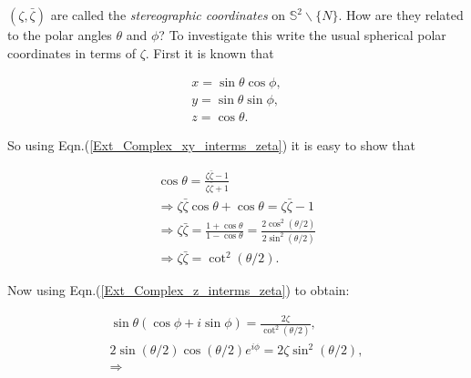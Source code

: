 $(\zeta, \bar{\zeta})$ are called the \textit{stereographic coordinates} on $\mathbb{S}^2 \backslash \{N\}$. How are they related to the polar angles $\theta$ and $\phi$? To investigate this write the usual spherical polar coordinates in terms of $\zeta$. First it is known that

\begin{eqnarray*}
x = \sin{\theta}\cos{\phi}, \\
y = \sin{\theta}\sin{\phi}, \\
z = \cos{\theta}.
\end{eqnarray*}

\noindent So using Eqn.(\ref{Ext_Complex_xy_interms_zeta}) it is easy to show that

\begin{eqnarray*}
\cos{\theta} = \frac{\zeta\bar{\zeta} - 1}{\zeta\bar{\zeta} + 1} \\
\Rightarrow \zeta\bar{\zeta}\cos{\theta} + \cos{\theta} = \zeta\bar{\zeta} - 1\\
\Rightarrow \zeta\bar{\zeta} = \frac{1 + \cos{\theta}}{1 - \cos{\theta}} = \frac{2\cos^2{\left(\theta/2\right)}}{2\sin^2{\left(\theta/2\right)}} \\
\Rightarrow \zeta\bar{\zeta} = \cot^2{\left(\theta/2\right)}.
\end{eqnarray*}

\noindent Now using Eqn.(\ref{Ext_Complex_z_interms_zeta}) to obtain:

\begin{eqnarray*}
\sin{\theta}(\cos{\phi} +i \sin{\phi}) = \frac{2\zeta}{\cot^2{\left(\theta/2\right)}}, \\
2\sin{\left(\theta/2\right)}\cos{\left(\theta/2\right)}e^{i\phi} = 2\zeta \sin^2{\left(\theta/2\right)}, \\
\Rightarrow 
\end{eqnarray*}












